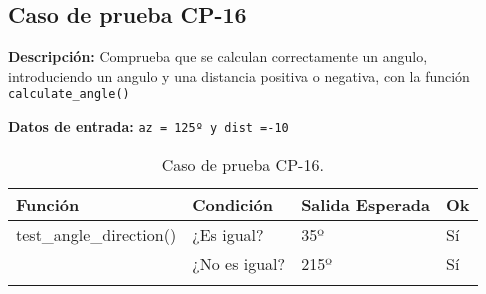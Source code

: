 \subsection{Caso de prueba CP-16}

\textbf{Descripción:} Comprueba que se calculan correctamente un angulo, introduciendo un angulo y una distancia positiva o negativa, con la función \texttt{calculate\_angle()}

\textbf{Datos de entrada:} \texttt{az = 125º y dist =-10}


\begin{longtable}[]{@{}llll@{}}
\toprule
\begin{minipage}[b]{0.6\columnwidth}\raggedright\strut
Función\strut
\end{minipage} & \begin{minipage}[b]{0.20\columnwidth}\raggedright\strut
Condición\strut
\end{minipage} & \begin{minipage}[b]{0.15\columnwidth}\raggedright\strut
Salida Esperada\strut
\end{minipage} & \begin{minipage}[b]{0.05\columnwidth}\raggedright\strut
Ok\strut
\end{minipage}\tabularnewline
\midrule
\endhead
\begin{minipage}[t]{0.6\columnwidth}\raggedright\strut
\small{test\_angle\_direction()}\strut
\end{minipage} & \begin{minipage}[t]{0.20\columnwidth}\raggedright\strut
¿Es igual?\strut
\end{minipage} & \begin{minipage}[t]{0.15\columnwidth}\raggedright\strut
35º\strut
\end{minipage} & \begin{minipage}[t]{0.05\columnwidth}\raggedright\strut
Sí\strut
\end{minipage}\tabularnewline
\begin{minipage}[t]{0.6\columnwidth}\raggedright\strut
\strut
\end{minipage} & \begin{minipage}[t]{0.20\columnwidth}\raggedright\strut
¿No es igual?\strut
\end{minipage} & \begin{minipage}[t]{0.15\columnwidth}\raggedright\strut
215º\strut
\end{minipage} & \begin{minipage}[t]{0.05\columnwidth}\raggedright\strut
Sí\strut
\end{minipage}\tabularnewline

\bottomrule
\caption{Caso de prueba CP-16.}
\end{longtable}

